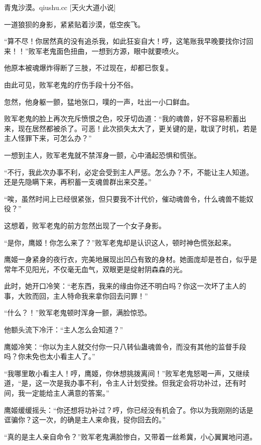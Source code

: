 
\begin{this_body}

青鬼沙漠。qiushu.cc [天火大道小说]

一道狼狈的身影，紧紧贴着沙漠，低空疾飞。

“算不尽！你居然真的没有追杀我，如此狂妄自大！哼，这笔账我早晚要找你讨回来！！”败军老鬼面色扭曲，一想到方源，眼中就要喷火。

他原本被魂爆炸得断了三肢，不过现在，却都已恢复。

由此可见，败军老鬼的疗伤手段十分不俗。

忽然，他身躯一颤，猛地张口，噗的一声，吐出一小口鲜血。

败军老鬼的脸上再次充斥愤恨之色，咬牙切齿道：“我的魂兽，好不容易积蓄出来，现在居然都被杀了。可恶！此次损失太大了，更关键的是，耽误了时机，若是主人怪罪下来，可怎么办？”

一想到主人，败军老鬼就不禁浑身一颤，心中涌起恐惧和慌张。

“不行，我此次办事不利，必定会受到主人严惩。怎么办？不，不能让主人知道。还是先隐瞒下来，再积蓄一支魂兽群出来交差。”

“唉，虽然时间上已经很紧张，但只要我不计代价，催动魂兽令，什么魂兽不能奴役？”

这想着，败军老鬼的前方忽然出现了一个女子身影。

“是你，鹰姬！你怎么来了？”败军老鬼却是认识这人，顿时神色慌张起来。

鹰姬一身紧身的夜行衣，完美地展现出凹凸有致的身材。她面庞却是苍白，似乎是常年不见阳光，不仅毫无血气，双眼更是绽射阴森森的光。

此时，她开口冷笑：“老东西，我来的缘由你还不明白吗？你这一次坏了主人的事，大败而回，主人特命我来拿你回去问罪！”

“什么？！”败军老鬼顿时浑身一颤，满脸惊恐。

他额头流下冷汗：“主人怎么会知道？”

鹰姬冷笑：“你以为主人就交付你一只八转仙蛊魂兽令，而没有其他的监督手段吗？你未免也太小看主人了。”

“我哪里敢小看主人！哼，鹰姬，你休想挑拨离间！”败军老鬼怒喝一声，又继续道，“是，这一次是我办事不利，令主人计划受挫。但我定会将功补过，还有时间，我一定能给主人满意的答案。”

鹰姬缓缓摇头：“你还想将功补过？哼，你已经没有机会了。你以为我刚刚的话是诓骗你？这一次，的确是主人来命我，捉你回去的。”

“真的是主人亲自命令？”败军老鬼满脸惨白，又带着一丝希冀，小心翼翼地问道。


\end{this_body}
